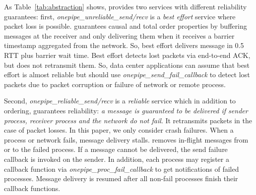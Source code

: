 As Table~\ref{tab:abstraction} shows, \sys{} provides two services with different reliability guarantees: first, \textit{onepipe\_unreliable\_send/recv} is a \emph{best effort} service where packet loss is possible. \sys{} guarantees causal and total order properties by buffering messages at the receiver and only delivering them when it receives a barrier timestamp aggregated from the network. So, best effort \sys{} delivers message in 0.5 RTT plus barrier wait time. %
Best effort \sys{} detects lost packets via end-to-end ACK, but does not retransmit them. 
So, data center applications can assume that best effort \sys{} is almost reliable but should use \textit{onepipe\_send\_fail\_callback} to detect lost packets due to packet corruption or failure of network or remote process.~

Second, \textit{onepipe\_reliable\_send/recv} is a \emph{reliable} service which in addition to ordering, guarantees reliability: \emph{a message is guaranteed to be delivered if sender process, receiver process and the network do not fail}. It retransmits packets in the case of packet losses. In this paper, we only consider crash failures. When a process or network fails, message delivery stalls.
\sys{} removes in-flight messages from or to the failed process.
If a message cannot be delivered, the send failure callback is invoked on the sender.
In addition, each process may register a callback function via \textit{onepipe\_proc\_fail\_callback} to get notifications of failed processes. Message delivery is resumed after all non-fail processes finish their callback functions.


